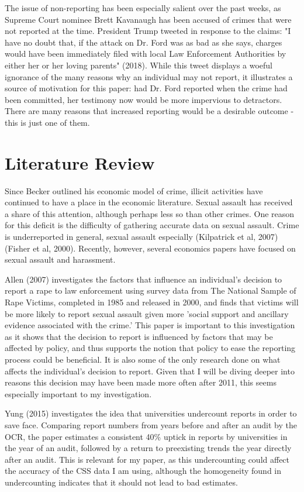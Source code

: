 \documentclass[AER]{AEA}
\begin{document}
The issue of non-reporting has been especially salient over the past weeks, as Supreme Court nominee Brett Kavanaugh has been accused of crimes that were not reported at the time. President Trump tweeted in response to the claims: "I have no doubt that, if the attack on Dr. Ford was as bad as she says, charges would have been immediately filed with local Law Enforcement Authorities by either her or her loving parents" (2018). While this tweet displays a woeful ignorance of the many reasons why an individual may not report, it illustrates a source of motivation for this paper: had Dr. Ford reported when the crime had been committed, her testimony now would be more impervious to detractors. There are many reasons that increased reporting would be a desirable outcome - this is just one of them. 

\section{Literature Review}

Since Becker outlined his economic model of crime, illicit activities have continued to have a place in the economic literature. Sexual assault has received a share of this attention, although perhaps less so than other crimes. One reason for this deficit is the difficulty of gathering accurate data on sexual assault. Crime is underreported in general, sexual assault especially (Kilpatrick et al, 2007) (Fisher et al, 2000). Recently, however, several economics papers have focused on sexual assault and harassment. 

Allen (2007) investigates the factors that influence an individual's decision to report a rape to law enforcement using survey data from The National Sample of Rape Victims, completed in 1985 and released in 2000, and finds that victims will be more likely to report sexual assault given more 'social support and ancillary evidence associated with the crime.' This paper is important to this investigation as it shows that the decision to report is influenced by factors that may be affected by policy, and thus supports the notion that policy to ease the reporting process could be beneficial. It is also some of the only research done on what affects the individual's decision to report. Given that I will be diving deeper into reasons this decision may have been made more often after 2011, this seems especially important to my investigation.

Yung (2015) investigates the idea that universities undercount reports in order to save face.  Comparing report numbers from years before and after an audit by the OCR, the paper estimates a consistent 40\% uptick in reports by universities in the year of an audit, followed by a return to preexisting trends the year directly after an audit. This is relevant for my paper, as this undercounting could affect the accuracy of the CSS data I am using, although the homogeneity found in undercounting indicates that it should not lead to bad estimates.
\end{document}
